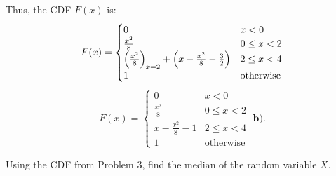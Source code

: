 \documentclass[a4paper, 10pt]{article}
\begin{document}
\begin{solution}
	Thus, the CDF \( F(x) \) is:
	\[
		F(x) = \begin{cases}
			0                                                                     & x < 0            \\
			\frac{x^2}{8}                                                         & 0 \leq x < 2     \\
			\left(\frac{x^2}{8}\right)_{x=2} + \left(x - \frac{x^2}{8} - \frac{3}{2}\right) & 2 \leq x < 4     \\
			1                                                                     & \text{otherwise}
		\end{cases}
	\]
	\[
		\boxed{F(x) = \begin{cases}
				0                     & x < 0            \\
				\frac{x^2}{8}         & 0 \leq x < 2     \\
				x - \frac{x^2}{8} - 1 & 2 \leq x < 4     \\
				1                     & \text{otherwise}
			\end{cases}} \; \textbf{b).}
	\]
\end{solution}

\newpage

\begin{problem}
Using the CDF from Problem 3, find the median of the random variable \( X \).
\end{problem}
\end{document}
